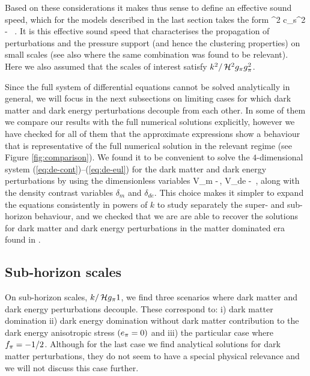 Based on these considerations it makes thus sense to define an effective sound speed, which for the models described in the last section takes the form 
\be 
\ceff^2 \equiv c_s^2 - \, .
\label{eq:pheno2}
\ee
It is this effective sound speed that characterises the propagation of perturbations and the pressure support (and hence the clustering properties) on small scales (see
also \cite{Sapone:2012nh,Sawicki:2012re,Sapone:2013wda} where the same combination was found to be relevant). Here we
also assumed that the scales of interest satisfy $ k^2/\H^2 \mug \gg^2 $.

Since the full system of differential equations cannot be solved analytically in general, we will focus in the next subsections on limiting cases for which dark matter and dark energy perturbations decouple from each other. In some of them we compare our results with the full numerical solutions explicitly, however we have checked for all of them that the approximate expressions show a behaviour that is representative of the full numerical solution in the relevant regime (see Figure \ref{fig:comparison}).
We found it to be convenient to solve the $4$-dimensional system (\ref{eq:de-cont})--(\ref{eq:de-eul}) for the dark matter and dark energy perturbations by using the dimensionless variables  
\be
V_m \equiv  -\,, \quad
V_{de} \equiv - \,,
\label{eq:pheno3} 
\ee
along with the density contrast variables $ \delta_m$ and $ \delta_{de}$. This choice makes it simpler to expand the equations consistently in powers of $k$ 
to study separately the super- and sub-horizon behaviour, and we checked that we are
are able to recover the solutions for dark matter and dark energy perturbations in the matter dominated era found in \cite{Sapone:2009kx}. 

\subsection{Sub-horizon scales}\label{subsection:4.1}

On sub-horizon scales, $ k/\H \mug  1 $, we find three scenarios where dark matter and dark energy perturbations decouple. These correspond to: i) dark matter domination ii) dark energy domination without dark matter contribution to the dark energy anisotropic stress $ (\aa = 0) $ and iii) the particular case where $ \ff = -1/2 $. Although for the last case we find analytical solutions for dark matter perturbations, they do not seem to have a special physical relevance and we will not discuss this case further.

